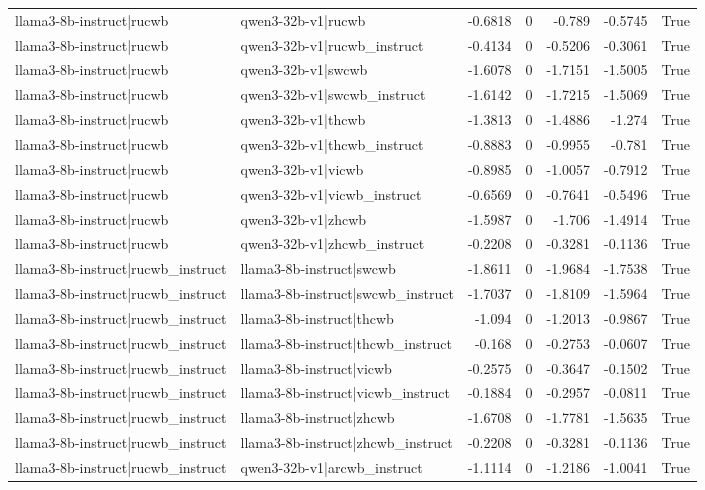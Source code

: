 \begin{table}
\begin{tabular}{l l r r r r l}
llama3-8b-instruct|rucwb & qwen3-32b-v1|rucwb & -0.6818 & 0 & -0.789 & -0.5745 & True \\
llama3-8b-instruct|rucwb & qwen3-32b-v1|rucwb_instruct & -0.4134 & 0 & -0.5206 & -0.3061 & True \\
llama3-8b-instruct|rucwb & qwen3-32b-v1|swcwb & -1.6078 & 0 & -1.7151 & -1.5005 & True \\
llama3-8b-instruct|rucwb & qwen3-32b-v1|swcwb_instruct & -1.6142 & 0 & -1.7215 & -1.5069 & True \\
llama3-8b-instruct|rucwb & qwen3-32b-v1|thcwb & -1.3813 & 0 & -1.4886 & -1.274 & True \\
llama3-8b-instruct|rucwb & qwen3-32b-v1|thcwb_instruct & -0.8883 & 0 & -0.9955 & -0.781 & True \\
llama3-8b-instruct|rucwb & qwen3-32b-v1|vicwb & -0.8985 & 0 & -1.0057 & -0.7912 & True \\
llama3-8b-instruct|rucwb & qwen3-32b-v1|vicwb_instruct & -0.6569 & 0 & -0.7641 & -0.5496 & True \\
llama3-8b-instruct|rucwb & qwen3-32b-v1|zhcwb & -1.5987 & 0 & -1.706 & -1.4914 & True \\
llama3-8b-instruct|rucwb & qwen3-32b-v1|zhcwb_instruct & -0.2208 & 0 & -0.3281 & -0.1136 & True \\
llama3-8b-instruct|rucwb_instruct & llama3-8b-instruct|swcwb & -1.8611 & 0 & -1.9684 & -1.7538 & True \\
llama3-8b-instruct|rucwb_instruct & llama3-8b-instruct|swcwb_instruct & -1.7037 & 0 & -1.8109 & -1.5964 & True \\
llama3-8b-instruct|rucwb_instruct & llama3-8b-instruct|thcwb & -1.094 & 0 & -1.2013 & -0.9867 & True \\
llama3-8b-instruct|rucwb_instruct & llama3-8b-instruct|thcwb_instruct & -0.168 & 0 & -0.2753 & -0.0607 & True \\
llama3-8b-instruct|rucwb_instruct & llama3-8b-instruct|vicwb & -0.2575 & 0 & -0.3647 & -0.1502 & True \\
llama3-8b-instruct|rucwb_instruct & llama3-8b-instruct|vicwb_instruct & -0.1884 & 0 & -0.2957 & -0.0811 & True \\
llama3-8b-instruct|rucwb_instruct & llama3-8b-instruct|zhcwb & -1.6708 & 0 & -1.7781 & -1.5635 & True \\
llama3-8b-instruct|rucwb_instruct & llama3-8b-instruct|zhcwb_instruct & -0.2208 & 0 & -0.3281 & -0.1136 & True \\
llama3-8b-instruct|rucwb_instruct & qwen3-32b-v1|arcwb_instruct & -1.1114 & 0 & -1.2186 & -1.0041 & True \\

\end{tabular}
\end{table}

